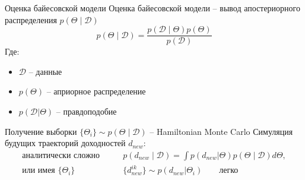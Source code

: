 \documentclass[12pt]{beamer}
\newcommand{\cond}{\;|\;}
\begin{document}
\begin{frame}{Оценка байесовской модели}
Оценка байесовской модели -- вывод апостериорного распределения $p(\Theta\cond\mathcal{D})$
\[p(\Theta\cond\mathcal{D}) =
\frac
{p(\mathcal{D}\cond\Theta)p(\Theta)}
{p(\mathcal{D})}\]
Где:
\begin{itemize}
	\item $\mathcal{D}$ -- данные
	\item $p(\Theta)$ -- априорное распределение
	\item $p(\mathcal{D}|\Theta)$ -- правдоподобие
\end{itemize}
Получение выборки $\{\Theta_i\}\sim p(\Theta\cond\mathcal{D})$ -- Hamiltonian Monte Carlo
Симуляция будущих траекторий доходностей $d_{new}$:
\begin{align*}
\text{аналитически сложно}&\qquad p(d_{new}\cond\mathcal{D})=\int p(d_{new}|\Theta)p(\Theta\cond\mathcal{D}) d\Theta,\\
\text{или имея $\{\Theta_i\}$}&\qquad \{d_{new}^{ik}\} \sim p(d_{new}|\Theta_i)\qquad\text{легко}
\end{align*}
\end{frame}
\end{document}
